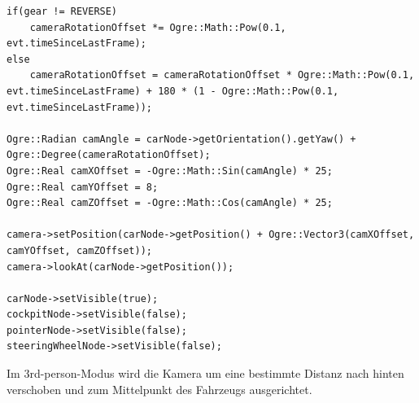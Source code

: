\begin{lstlisting}[caption={Positionierung der 3rd-Person-Kamera},label={positionierung_tp_kamera}]
if(gear != REVERSE)
	cameraRotationOffset *= Ogre::Math::Pow(0.1, evt.timeSinceLastFrame);
else
	cameraRotationOffset = cameraRotationOffset * Ogre::Math::Pow(0.1, evt.timeSinceLastFrame) + 180 * (1 - Ogre::Math::Pow(0.1, evt.timeSinceLastFrame));

Ogre::Radian camAngle = carNode->getOrientation().getYaw() + Ogre::Degree(cameraRotationOffset);
Ogre::Real camXOffset = -Ogre::Math::Sin(camAngle) * 25;
Ogre::Real camYOffset = 8;
Ogre::Real camZOffset = -Ogre::Math::Cos(camAngle) * 25;

camera->setPosition(carNode->getPosition() + Ogre::Vector3(camXOffset, camYOffset, camZOffset));
camera->lookAt(carNode->getPosition());

carNode->setVisible(true);
cockpitNode->setVisible(false);
pointerNode->setVisible(false);
steeringWheelNode->setVisible(false);
\end{lstlisting}

Im \gls{3rd-person}-Modus wird die Kamera um eine bestimmte Distanz nach hinten verschoben und zum Mittelpunkt des Fahrzeugs ausgerichtet.



